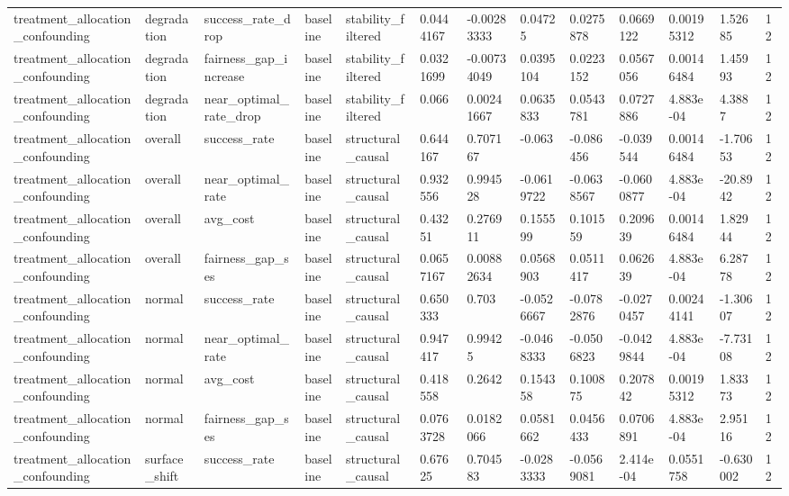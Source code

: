 \begin{tabular}{lllllllllllll}
treatment\_allocation\_confounding & degradation & success\_rate\_drop & baseline & stability\_filtered & 0.0444167 & -0.00283333 & 0.04725 & 0.0275878 & 0.0669122 & 0.00195312 & 1.52685 & 12 \\
treatment\_allocation\_confounding & degradation & fairness\_gap\_increase & baseline & stability\_filtered & 0.0321699 & -0.00734049 & 0.0395104 & 0.0223152 & 0.0567056 & 0.00146484 & 1.45993 & 12 \\
treatment\_allocation\_confounding & degradation & near\_optimal\_rate\_drop & baseline & stability\_filtered & 0.066 & 0.00241667 & 0.0635833 & 0.0543781 & 0.0727886 & 4.883e-04 & 4.3887 & 12 \\
treatment\_allocation\_confounding & overall & success\_rate & baseline & structural\_causal & 0.644167 & 0.707167 & -0.063 & -0.086456 & -0.039544 & 0.00146484 & -1.70653 & 12 \\
treatment\_allocation\_confounding & overall & near\_optimal\_rate & baseline & structural\_causal & 0.932556 & 0.994528 & -0.0619722 & -0.0638567 & -0.0600877 & 4.883e-04 & -20.8942 & 12 \\
treatment\_allocation\_confounding & overall & avg\_cost & baseline & structural\_causal & 0.43251 & 0.276911 & 0.155599 & 0.101559 & 0.209639 & 0.00146484 & 1.82944 & 12 \\
treatment\_allocation\_confounding & overall & fairness\_gap\_ses & baseline & structural\_causal & 0.0657167 & 0.00882634 & 0.0568903 & 0.0511417 & 0.062639 & 4.883e-04 & 6.28778 & 12 \\
treatment\_allocation\_confounding & normal & success\_rate & baseline & structural\_causal & 0.650333 & 0.703 & -0.0526667 & -0.0782876 & -0.0270457 & 0.00244141 & -1.30607 & 12 \\
treatment\_allocation\_confounding & normal & near\_optimal\_rate & baseline & structural\_causal & 0.947417 & 0.99425 & -0.0468333 & -0.0506823 & -0.0429844 & 4.883e-04 & -7.73108 & 12 \\
treatment\_allocation\_confounding & normal & avg\_cost & baseline & structural\_causal & 0.418558 & 0.2642 & 0.154358 & 0.100875 & 0.207842 & 0.00195312 & 1.83373 & 12 \\
treatment\_allocation\_confounding & normal & fairness\_gap\_ses & baseline & structural\_causal & 0.0763728 & 0.0182066 & 0.0581662 & 0.0456433 & 0.0706891 & 4.883e-04 & 2.95116 & 12 \\
treatment\_allocation\_confounding & surface\_shift & success\_rate & baseline & structural\_causal & 0.67625 & 0.704583 & -0.0283333 & -0.0569081 & 2.414e-04 & 0.0551758 & -0.630002 & 12 \\

\end{tabular}
